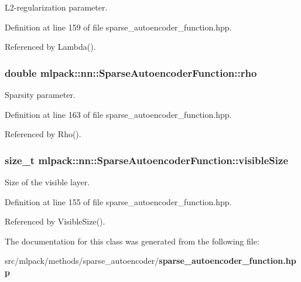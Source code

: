L2-\/regularization parameter. 



Definition at line 159 of file sparse\-\_\-autoencoder\-\_\-function.\-hpp.



Referenced by Lambda().

\subsubsection[{rho}]{\setlength{\rightskip}{0pt plus 5cm}double mlpack\-::nn\-::\-Sparse\-Autoencoder\-Function\-::rho\hspace{0.3cm}{\ttfamily [private]}}\label{classmlpack_1_1nn_1_1SparseAutoencoderFunction_a9afee0f01482da62e7fb812103e809d0}


Sparsity parameter. 



Definition at line 163 of file sparse\-\_\-autoencoder\-\_\-function.\-hpp.



Referenced by Rho().

\subsubsection[{visible\-Size}]{\setlength{\rightskip}{0pt plus 5cm}size\-\_\-t mlpack\-::nn\-::\-Sparse\-Autoencoder\-Function\-::visible\-Size\hspace{0.3cm}{\ttfamily [private]}}\label{classmlpack_1_1nn_1_1SparseAutoencoderFunction_a7cc85a163755fcdd9f7ab105ce5ee1a7}


Size of the visible layer. 



Definition at line 155 of file sparse\-\_\-autoencoder\-\_\-function.\-hpp.



Referenced by Visible\-Size().



The documentation for this class was generated from the following file\-:\begin{DoxyCompactItemize}
\item 
src/mlpack/methods/sparse\-\_\-autoencoder/{\bf sparse\-\_\-autoencoder\-\_\-function.\-hpp}\end{DoxyCompactItemize}
